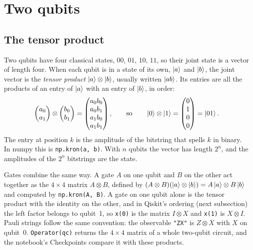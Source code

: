 \documentclass[11pt]{article}
\newcommand{\code}[1]{\texttt{#1}}
\begin{document}
\section{Two qubits}

\subsection{The tensor product}

Two qubits have four classical states, $00$, $01$, $10$, $11$, so their joint state is a vector of length four. When each qubit is in a state of its own, $\ket{a}$ and $\ket{b}$, the joint vector is the \emph{tensor product} $\ket{a}\otimes\ket{b}$, usually written $\ket{ab}$. Its entries are all the products of an entry of $\ket{a}$ with an entry of $\ket{b}$, in order:
\begin{equation}
\begin{pmatrix}a_0\\a_1\end{pmatrix}\otimes\begin{pmatrix}b_0\\b_1\end{pmatrix}
= \begin{pmatrix}a_0 b_0\\ a_0 b_1\\ a_1 b_0\\ a_1 b_1\end{pmatrix},
\qquad\text{so}\qquad
\ket{0}\otimes\ket{1} = \begin{pmatrix}0\\1\\0\\0\end{pmatrix} = \ket{01} .
\label{eq:kron}
\end{equation}
The entry at position $k$ is the amplitude of the bitstring that spells $k$ in binary. In numpy this is \code{np.kron(a, b)}. With $n$ qubits the vector has length $2^n$, and the amplitudes of the $2^n$ bitstrings are the state.

Gates combine the same way. A gate $A$ on one qubit and $B$ on the other act together as the $4\times4$ matrix $A\otimes B$, defined by $(A\otimes B)(\ket{a}\otimes\ket{b}) = A\ket{a}\otimes B\ket{b}$ and computed by \code{np.kron(A, B)}. A gate on one qubit alone is the tensor product with the identity on the other, and in Qiskit's ordering (next subsection) the left factor belongs to qubit~1, so \code{x(0)} is the matrix $I\otimes X$ and \code{x(1)} is $X\otimes I$. Pauli strings follow the same convention: the observable \code{"ZX"} is $Z\otimes X$ with $X$ on qubit~0. \code{Operator(qc)} returns the $4\times4$ matrix of a whole two-qubit circuit, and the notebook's Checkpoints compare it with these products.
\end{document}
